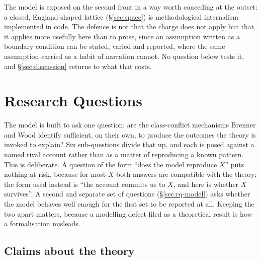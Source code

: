 \documentclass[11pt,english]{article}
\begin{document}
The model is exposed on the second front in a way worth conceding at the outset: a closed, England-shaped lattice (\S\ref{sec:space}) is methodological internalism implemented in code. The defence is not that the charge does not apply but that it applies more usefully here than to prose, since an assumption written as a boundary condition can be stated, varied and reported, where the same assumption carried as a habit of narration cannot. No question below tests it, and \S\ref{sec:discussion} returns to what that costs.

\section{Research Questions}
\label{sec:rq}

The model is built to ask one question: are the class-conflict mechanisms Brenner and Wood identify sufficient, on their own, to produce the outcomes the theory is invoked to explain? Six sub-questions divide that up, and each is posed against a named rival account rather than as a matter of reproducing a known pattern. This is deliberate. A question of the form ``does the model reproduce $X$'' puts nothing at risk, because for most $X$ both answers are compatible with the theory; the form used instead is ``the account commits us to $X$, and here is whether $X$ survives''. A second and separate set of questions (\S\ref{sec:rq-model}) asks whether the model behaves well enough for the first set to be reported at all. Keeping the two apart matters, because a modelling defect filed as a theoretical result is how a formalisation misleads.

\subsection{Claims about the theory}
\label{sec:rq-theory}
\end{document}

